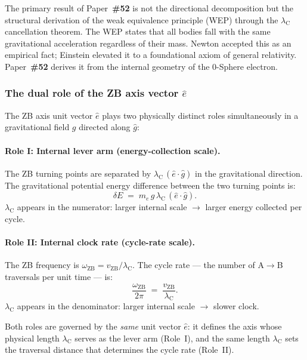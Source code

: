 \documentclass[12pt,letterpaper]{article}
\newcommand{\paperno}[1]{\textbf{\#{}#1}}
\newcommand{\vZB}{v_{\mathrm{ZB}}}
\newcommand{\lambdaC}{\lambda_{\mathrm{C}}}
\newcommand{\omZB}{\omega_{\text{ZB}}}
\begin{document}
The primary result of Paper~\paperno{52} is not the directional decomposition but the structural derivation of the weak equivalence principle (WEP) through the $\lambdaC$ cancellation theorem.
The WEP states that all bodies fall with the same gravitational acceleration regardless of their mass.
Newton accepted this as an empirical fact; Einstein elevated it to a foundational axiom of general relativity.
Paper~\paperno{52} derives it from the internal geometry of the 0-Sphere electron.

\subsubsection{The dual role of the ZB axis vector $\hat{e}$}

The ZB axis unit vector $\hat{e}$ plays two physically distinct roles simultaneously in a gravitational field $g$ directed along $\hat{g}$:

\paragraph{Role I: Internal lever arm (energy-collection scale).} The ZB turning points are separated by $\lambdaC\,(\hat{e}\cdot\hat{g})$ in the gravitational direction. The gravitational potential energy difference between the two turning points is:
\begin{equation}
\delta E \;=\; m_e\,g\,\lambdaC\,(\hat{e}\cdot\hat{g}).
\label{eq:dE_53}
\end{equation}
$\lambdaC$ appears in the numerator: larger internal scale $\to$ larger energy collected per cycle.

\paragraph{Role II: Internal clock rate (cycle-rate scale).} The ZB frequency is $\omZB = \vZB/\lambdaC$. The cycle rate --- the number of A$\to$B traversals per unit time --- is:
\begin{equation}
\frac{\omZB}{2\pi} \;=\; \frac{\vZB}{\lambdaC}.
\label{eq:cycle_53}
\end{equation}
$\lambdaC$ appears in the denominator: larger internal scale $\to$ slower clock.

Both roles are governed by the \emph{same} unit vector $\hat{e}$: it defines the axis whose physical length $\lambdaC$ serves as the lever arm (Role~I), and the same length $\lambdaC$ sets the traversal distance that determines the cycle rate (Role~II).
\end{document}
